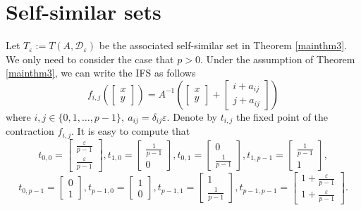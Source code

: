 \documentclass[12pt, reqno]{amsart}
\numberwithin{equation}{section}
\begin{document}
\section{\bf Self-similar sets}
Let $T_{\varepsilon}:=T(A, {\mathcal D}_\varepsilon)$ be the associated self-similar set in Theorem \ref{mainthm3}. We only need to consider the case that $p>0$. Under the assumption of Theorem \ref{mainthm3}, we can write the IFS as follows
\begin{equation}\label{eq.IFS}
f_{i,j}\left(\left[\begin{array}{c}
x\\
y
\end{array}\right]\right)=A^{-1}\left(\left[\begin{array}{c}
x\\
y
\end{array}\right]+\left[\begin{array}{c}
i+a_{ij}\\
j+a_{ij}
\end{array}\right]\right)
\end{equation}
where $i,j\in\{0,1,\dots,p-1\}, \  a_{ij}=\delta_{ij}\varepsilon$. Denote by $t_{i,j}$  the fixed point of  the contraction $f_{i,j}$. It is easy to compute that
$$t_{0,0}=\left[\begin{array}{c}\frac{\varepsilon}{p-1}\\ \frac{\varepsilon}{p-1}\end{array}\right],t_{1,0}=\left[\begin{array}{c}\frac{1}{p-1}\\ 0\end{array}\right],t_{0,1}=\left[\begin{array}{c}0\\\frac{1}{p-1}\end{array}\right],t_{1,p-1}=\left[\begin{array}{c}\frac{1}{p-1}\\1\end{array}\right],$$
$$t_{0,p-1}=\left[\begin{array}{c}0\\1\end{array}\right],t_{p-1,0}=\left[\begin{array}{c}1\\0\end{array}\right],t_{p-1,1}=\left[\begin{array}{c}1\\\frac{1}{p-1}\end{array}\right],
t_{p-1,p-1}=\left[\begin{array}{c}1+\frac{\varepsilon}{p-1}\\1+\frac{\varepsilon}{p-1}\end{array}\right].$$
\end{document}
